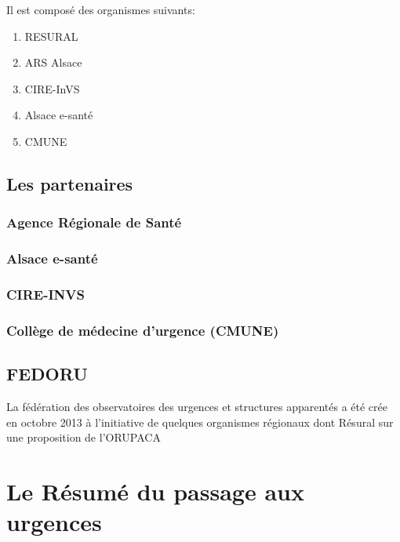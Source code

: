 \documentclass[12pt,english,french,twoside]{book}\usepackage[]{graphicx}\usepackage[]{color}
\begin{document}
Il est composé des organismes suivants:
\begin{enumerate}
  \item RESURAL 
  \item ARS Alsace
  \item CIRE-InVS
  \item Alsace e-santé
  \item CMUNE
\end{enumerate}


\section*{Les partenaires}

  \subsection*{Agence Régionale de Santé}
    
  \subsection*{Alsace e-santé}
    
  \subsection*{CIRE-INVS}
    
  \subsection*{Collège de médecine d'urgence (CMUNE)}

\section*{FEDORU}
  
La fédération des observatoires des urgences et structures apparentés a été crée en octobre 2013 à l'initiative de quelques organismes régionaux dont Résural sur une proposition de l'ORUPACA 


\newpage
\chapter{Le Résumé du passage aux urgences}


\end{document}
